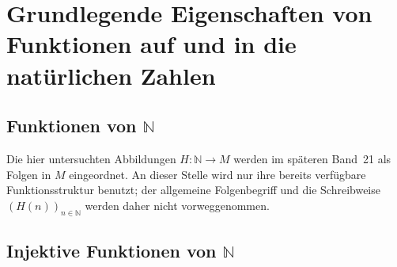\documentclass[main.tex]{subfiles}
\begin{document}
\section{Grundlegende Eigenschaften von Funktionen auf und in die natürlichen Zahlen}

\subsection{Funktionen von \(\mathbb{N}\)}

Die hier untersuchten Abbildungen \(H\colon\mathbb N\to M\) werden im
späteren Band~21 als Folgen in \(M\) eingeordnet. An dieser Stelle wird nur
ihre bereits verfügbare Funktionsstruktur benutzt; der allgemeine
Folgenbegriff und die Schreibweise \((H(n))_{n\in\mathbb N}\) werden daher
nicht vorweggenommen.

\begin{tabproof}
\end{tabproof}

\begin{tabproof}
\end{tabproof}

\subsection{Injektive Funktionen von \(\mathbb{N}\)}
\end{document}

